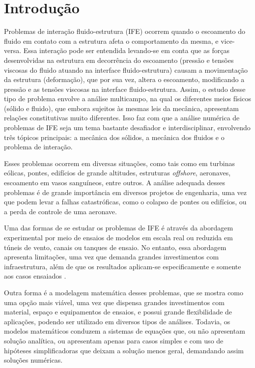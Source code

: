 \chapter{Introdução}\label{CapIntroducao}

Problemas de interação fluido-estrutura (IFE) ocorrem quando o escoamento do fluido em contato com a estrutura afeta o comportamento da mesma, e vice-versa. Essa interação pode ser entendida levando-se em conta que as forças desenvolvidas na estrutura em decorrência do escoamento (pressão e tensões viscosas do fluido atuando na interface fluido-estrutura) causam a movimentação da estrutura (deformação), que por sua vez, altera o escoamento, modificando a pressão e as tensões viscosas na interface fluido-estrutura. Assim, o estudo desse tipo de problema envolve a análise multicampo, na qual os diferentes meios físicos (sólido e fluido), que embora sujeitos às mesmas leis da mecânica, apresentam relações constitutivas muito diferentes. Isso faz com que a análise numérica de problemas de IFE seja um tema bastante desafiador e interdisciplinar, envolvendo três tópicos principais: a mecânica dos sólidos, a mecânica dos fluidos e o problema de interação.

Esses problemas ocorrem em diversas situações, como tais como em turbinas eólicas, pontes, edifícios de grande altitudes, estruturas \textit{offshore}, aeronaves, escoamento em vasos sanguíneos, entre outros. A análise adequada desses problemas é de grande importância em diversos projetos de engenharia, uma vez que podem levar a falhas catastróficas, como o colapso de pontes ou edifícios, ou a perda de controle de uma aeronave.

Uma das formas de se estudar os problemas de IFE é através da abordagem experimental por meio de ensaios de modelos em escala real ou reduzida em túneis de vento, canais ou tanques de ensaio. No entanto, essa abordagem apresenta limitações, uma vez que demanda grandes investimentos com infraestrutura, além de que os resultados aplicam-se especificamente e somente aos casos ensaiados \cite{fernandes2020tecnica}.

Outra forma é a modelagem matemática desses problemas, que se mostra como uma opção mais viável, uma vez que dispensa grandes investimentos com material, espaço e equipamentos de ensaios, e possui grande flexibilidade de aplicações, podendo ser utilizado em diversos tipos de análises. Todavia, os modelos matemáticos conduzem a sistemas de equações que, ou não apresentam solução analítica, ou apresentam apenas para casos simples e com uso de hipóteses simplificadoras que deixam a solução menos geral, demandando assim soluções numéricas.

